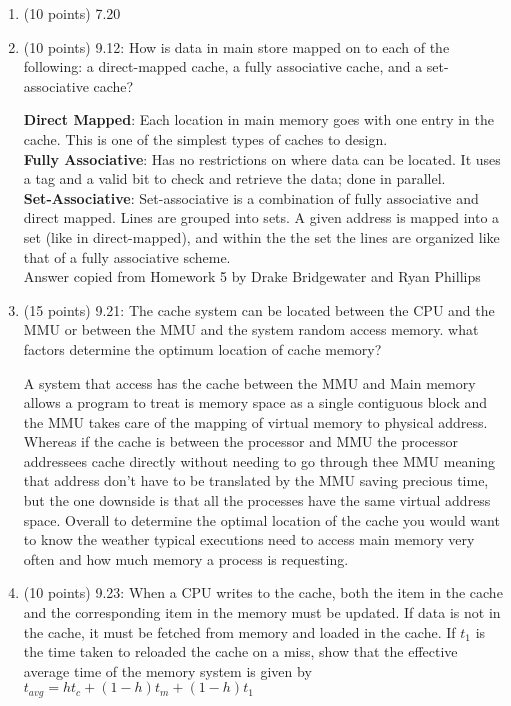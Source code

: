 \documentclass[letterpaper,10pt,onecolumn,titlepage]{article}
\begin{document}
\begin{enumerate}
\item (10 points) 7.20

\item (10 points) 9.12: How is data in main store mapped on to each of the following: a direct-mapped cache, a fully associative cache, and a set-associative cache? 

\begin{mdframed}[style=MyFrame]
\textbf{Direct Mapped}: Each location in main memory goes with one entry in the cache. This is one of the simplest types of caches to design.\\
\textbf{Fully Associative}: Has no restrictions on where data can be located. It uses a tag and a valid bit to check and retrieve the data; done in parallel. \\
\textbf{Set-Associative}: Set-associative is a combination of fully associative and direct mapped. Lines are grouped into sets. A given address is mapped into a set (like in direct-mapped), and within the the set the lines are organized like that of a fully associative scheme. \\
Answer copied from Homework 5 by Drake Bridgewater and Ryan Phillips \cite{HW5}
\end{mdframed}
\item (15 points) 9.21: The cache system can be located between the CPU and the MMU or between the MMU and the system random access memory. what factors determine the optimum location of cache memory?
\begin{mdframed}[style=MyFrame]
A system that access has the cache between the MMU and Main memory allows a program to treat is memory space as a single contiguous block and the MMU takes care of the mapping of virtual memory to physical address.  Whereas if the cache is between the processor and MMU the processor addressees cache directly without needing to go through thee MMU meaning that address don't have to be translated by the MMU saving precious time, but the one downside is that all the processes have the same virtual address space. Overall to determine the optimal location of the cache you would want to know the weather typical executions need to access main memory very often and how much memory a process is requesting. 
\end{mdframed}

\item (10 points) 9.23: When a CPU  writes to the cache, both the item in the cache and the corresponding item in the memory must be updated. If data is not in the cache, it must be fetched from memory and loaded in the cache. If $t_1$ is the time taken to reloaded the cache on a miss, show that the effective average time of the memory system is given by $t_{avg}=ht_c+(1-h)t_m+(1-h)t_1$


\end{enumerate}
\end{document}
